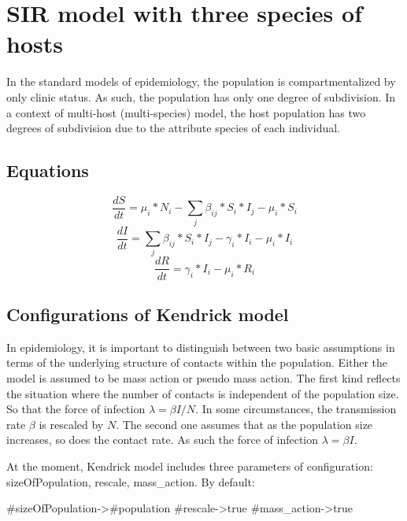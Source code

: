 \documentclass[a4paper,10pt,twoside]{book}
\begin{document}
\section{ SIR model with three species of hosts}
In the standard models of epidemiology, the population is compartmentalized by only clinic status.
As such, the population has only one degree of subdivision.
In a context of multi-host (multi-species) model, the host population has two degrees of subdivision due to the attribute species of each individual.
\subsection{ Equations}

  \begin{equation}
    \frac{dS}{dt} = \mu_i*N_i - \sum_j \beta_{ij}*S_i*I_j - \mu_i*S_i
  \end{equation}
  \begin{equation}
    \frac{dI}{dt} = \sum_j \beta_{ij}*S_i*I_j - \gamma_i*I_i - \mu_i*I_i
  \end{equation}
  \begin{equation}
    \frac{dR}{dt} = \gamma_i*I_i - \mu_i*R_i
  \end{equation}
  
\subsection{ Configurations of Kendrick model}
In epidemiology, it is important to distinguish between two basic assumptions in terms of the underlying structure of contacts within the population.
Either the model is assumed to be mass action or pseudo mass action.
The first kind reflects the situation where the number of contacts is independent of the population size.
So that the force of infection  $\lambda = \beta I / N$.
In some circumstances, the transmission rate  $\beta$ is rescaled by  $N$.
The second one assumes that as the population size increases, so does the contact rate.
As such the force of infection  $\lambda = \beta I$.

At the moment, Kendrick model includes three parameters of configuration: sizeOfPopulation, rescale, mass\_action.
By default:


\begin{code}{}
#sizeOfPopulation->#population
#rescale->true
#mass_action->true
\end{code}
\end{document}
